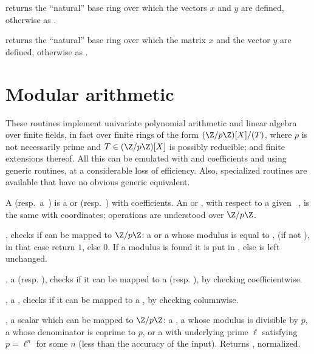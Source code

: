  returns
the ``natural'' base ring over which the vectors $x$ and $y$ are defined,
otherwise as .

returns the ``natural'' base ring over which the matrix $x$ and the vector
$y$ are defined, otherwise as .

\section{Modular arithmetic}

\noindent These routines implement univariate polynomial arithmetic and
linear algebra over finite fields, in fact over finite rings of the form
$(\Z/p\Z)[X]/(T)$, where $p$ is not necessarily prime and $T\in(\Z/p\Z)[X]$ is
possibly reducible; and finite extensions thereof. All this can be emulated
with  and  coefficients and using generic routines,
at a considerable loss of efficiency. Also, specialized routines are
available that have no obvious generic equivalent.

 A 
(resp.~a~) is a  or  (resp.~) with
 coefficients. An  or , with respect to a given
~, is the same with  coordinates; operations are
understood over $\Z/p\Z$.


, checks if  can be mapped to
$\Z/p\Z$: a  or a  whose modulus is equal to ,
(if  not ), in that case return $1$, else $0$. If a modulus
is found it is put in , else  is left unchanged.

,  a  (resp. ),
checks if it can be mapped to a  (resp. ), by checking
 coefficientwise.

,  a ,
checks if it can be mapped to a , by checking 
columnwise.

,  a scalar which can be mapped to
$\Z/p\Z$: a , a  whose modulus is divisible by $p$,
a  whose denominator is coprime to $p$, or a  with
underlying prime $\ell$ satisfying $p = \ell^n$ for some $n$ (less than the
accuracy of the input). Returns , normalized.


